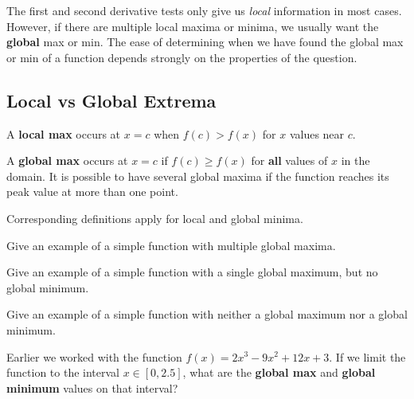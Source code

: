 
The first and second derivative tests only give us {\em local}
information in most cases.  However, if there are multiple local
maxima or minima, we usually want the {\bf global} max or min.  The
ease of determining when we have found the global max or min of a
function depends strongly on the properties of the question.

\begin{boxnote}

  \subsection*{Local vs Global Extrema}

  A {\bf local max} occurs at $x=c$ when $f(c) > f(x)$ for $x$ values
  near $c$.

  A {\bf global max} occurs at $x=c$ if $f(c) \ge f(x)$ for {\bf all}
  values of $x$ in the domain.  It is possible to have several global
  maxima if the function reaches its peak value at more than one
  point.

  Corresponding definitions apply for local and global minima.

\end{boxnote}

\newpage

\problem Give an example of a simple function with multiple global
  maxima.

\vfill

\problem Give an example of a simple function with a single global
  maximum, but no global minimum.

\vfill

\problem Give an example of a simple function with neither a global
  maximum nor a global minimum.

\vfill


\newpage \problem Earlier we worked with the function $f(x) = 2 x^3 -
  9 x^2 + 12 x +3$.  If we limit the function to the interval $x \in
  [0, 2.5]$, what are the {\bf global max} and {\bf global minimum}
  values on that interval?  



\vfill
\vfill

\newpage


